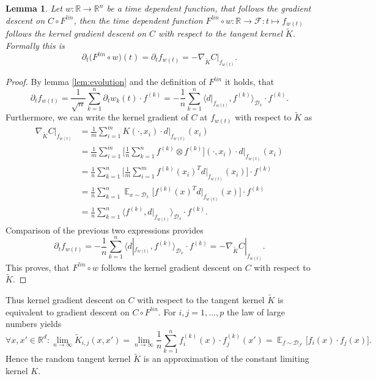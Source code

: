 \documentclass[11pt, a4paper]{article}
\newtheorem{lemma}[theorem]{Lemma}
\newcommand{\R}{\mathds{R}}
\newcommand{\D}{\mathcal{D}}
\newcommand{\F}{\mathcal{F}}
\DeclareMathOperator*{\E}{\mathds{E}}
\begin{document}
\begin{lemma}
Let $w: \R \to \R^n$ be a time dependent function, that follows the gradient descent on $C \circ F^\textit{lin}$, then the time dependent function $F^\textit{lin} \circ w : \R \to \F : t \mapsto f_{w(t)}$ follows the kernel gradient descent on $C$ with respect to the tangent kernel $\tilde{K}$. Formally this is
\[ \partial_t \big (F^\textit{lin} \circ w \big )(t) = \partial_tf_{w(t)} = -\nabla_{\tilde{K}}C|_{f_{w(t)}}. \]
\end{lemma}

\begin{proof}
By lemma \ref{lem:evolution} and the definition of $F^\textit{lin}$ it holds, that 
\[ \partial_tf_{w(t)} = \frac{1}{\sqrt{n}} \sum_{k=1}^{n} \partial_t w_k(t) \cdot f^{(k)} = - \frac{1}{n} \sum_{k=1}^{n} \big \langle d|_{f_{w(t)}}, f^{(k)} \big \rangle_{\D_x} \cdot f^{(k)}. \]
Furthermore, we can write the kernel gradient of $C$ at $f_{w(t)}$ with respect to $\tilde{K}$ as
\[ \begin{split}
\nabla_{\tilde{K}} C|_{f_{w(t)}}
&= \frac{1}{m} \sum_{i=1}^{m} K(\cdot,x_i) \cdot d|_{f_{w(t)}}(x_i) \\\
&= \frac{1}{m} \sum_{i=1}^{m} \bigg [ \frac{1}{n} \sum_{k=1}^{n}f^{(k)} \otimes f^{(k)} \bigg ] (\cdot,x_i) \cdot d|_{f_{w(t)}}(x_i) \\\
&= \frac{1}{n} \sum_{k=1}^{n} \bigg [ \frac{1}{m} \sum_{i=1}^{m} f^{(k)}(x_i)	^T d|_{f_{w(t)}}(x_i) \bigg ] \cdot f^{(k)} \\\
&= \frac{1}{n} \sum_{k=1}^{n} \E_{x \sim \D_x} \Big [ f^{(k)}(x)^T d|_{f_{w(t)}}(x) \Big ] \cdot f^{(k)} \\\
&= \frac{1}{n} \sum_{k=1}^{n} \big \langle f^{(k)}, d|_{f_{w(t)}} \big \rangle_{\D_x} \cdot f^{(k)}.
\end{split} \]
Comparison of the previous two expressions provides
\[ \partial_tf_{w(t)} = - \frac{1}{n} \sum_{k=1}^{n} \big \langle d|_{f_{w(t)}}, f^{(k)} \big \rangle_{\D_x} \cdot f^{(k)} = -\nabla_{\tilde{K}} C|_{f_{w(t)}}. \]
This proves, that $F^\textit{lin} \circ w$ follows the kernel gradient descent on $C$ with respect to $\tilde{K}$.
\end{proof}

Thus kernel gradient descent on $C$ with respect to the tangent kernel $\tilde{K}$ is equivalent to gradient descent on $C \circ F^\textit{lin}$. For $i,j = 1, \dots, p$ the law of large numbers yields
\[ \forall x,x' \in \R^d : \lim_{n \to \infty} \tilde{K}_{i,j}(x,x') = \lim_{n \to \infty} \frac{1}{n} \sum_{k=1}^{n} f_i^{(k)}(x) \cdot f_j^{(k)}(x') = \E_{f \sim \D_{\F}} \Big [ f_i(x) \cdot f_j(x) \Big ]. \]
Hence the random tangent kernel $\tilde{K}$ is an approximation of the constant limiting kernel $K$.
\end{document}
